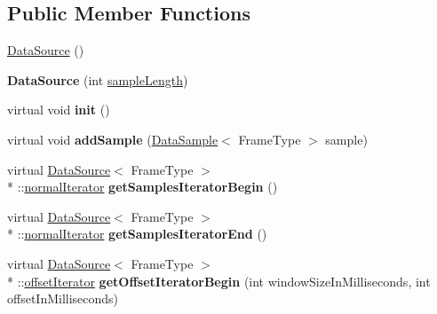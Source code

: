 \subsection*{Public Member Functions}
\begin{DoxyCompactItemize}
\item 
\hyperlink{classspeech_1_1raw__data_1_1DataSource_a5828f533581fe29765e094dcb2ca6fd5}{Data\+Source} ()
\item 
\hypertarget{classspeech_1_1raw__data_1_1DataSource_ad31cd6f9f9e6527243261bce9255550b}{{\bfseries Data\+Source} (int \hyperlink{classspeech_1_1raw__data_1_1DataSource_a6041f72109ebba9e84e49d71f626b8ea}{sample\+Length})}\label{classspeech_1_1raw__data_1_1DataSource_ad31cd6f9f9e6527243261bce9255550b}

\item 
\hypertarget{classspeech_1_1raw__data_1_1DataSource_a9eaf6b2fb4e0a08be1c755413fce79fa}{virtual void {\bfseries init} ()}\label{classspeech_1_1raw__data_1_1DataSource_a9eaf6b2fb4e0a08be1c755413fce79fa}

\item 
\hypertarget{classspeech_1_1raw__data_1_1DataSource_a87049484c5bdaed0a3cbb744156dc4cc}{virtual void {\bfseries add\+Sample} (\hyperlink{classspeech_1_1raw__data_1_1DataSample}{Data\+Sample}$<$ Frame\+Type $>$ sample)}\label{classspeech_1_1raw__data_1_1DataSource_a87049484c5bdaed0a3cbb744156dc4cc}

\item 
\hypertarget{classspeech_1_1raw__data_1_1DataSource_a3ec31b1ab7642b5cb9db18ca92837e60}{virtual \hyperlink{classspeech_1_1raw__data_1_1DataSource}{Data\+Source}$<$ Frame\+Type $>$\\*
\+::\hyperlink{classspeech_1_1raw__data_1_1DataSource_1_1normalIterator}{normal\+Iterator} {\bfseries get\+Samples\+Iterator\+Begin} ()}\label{classspeech_1_1raw__data_1_1DataSource_a3ec31b1ab7642b5cb9db18ca92837e60}

\item 
\hypertarget{classspeech_1_1raw__data_1_1DataSource_ae0c3a519998215818bc7ae4d03d964db}{virtual \hyperlink{classspeech_1_1raw__data_1_1DataSource}{Data\+Source}$<$ Frame\+Type $>$\\*
\+::\hyperlink{classspeech_1_1raw__data_1_1DataSource_1_1normalIterator}{normal\+Iterator} {\bfseries get\+Samples\+Iterator\+End} ()}\label{classspeech_1_1raw__data_1_1DataSource_ae0c3a519998215818bc7ae4d03d964db}

\item 
\hypertarget{classspeech_1_1raw__data_1_1DataSource_a7cf64445102aa54a7a5e3a3323843cc3}{virtual \hyperlink{classspeech_1_1raw__data_1_1DataSource}{Data\+Source}$<$ Frame\+Type $>$\\*
\+::\hyperlink{classspeech_1_1raw__data_1_1DataSource_1_1offsetIterator}{offset\+Iterator} {\bfseries get\+Offset\+Iterator\+Begin} (int window\+Size\+In\+Milliseconds, int offset\+In\+Milliseconds)}\label{classspeech_1_1raw__data_1_1DataSource_a7cf64445102aa54a7a5e3a3323843cc3}


\end{DoxyCompactItemize}
